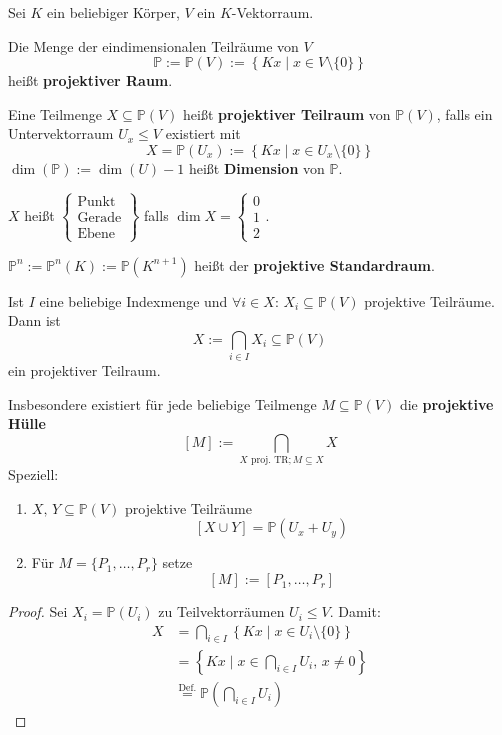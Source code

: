 \documentclass[parskip,a4paper,twoside,DIV15,BCOR12mm]{scrbook}
\begin{document}
Sei \(K\) ein beliebiger Körper, \(V\) ein \(K\)-Vektorraum.
\begin{definition}
Die Menge der eindimensionalen Teilräume von \(V\)
\[
\mathbb{P}:=\mathbb{P}(V):=\left\{Kx\mid x\in V\setminus\{0\}\right\}
\]
heißt \textbf{projektiver Raum}.

Eine Teilmenge \(X\subseteq\mathbb{P}(V)\) heißt 
\textbf{projektiver Teilraum} von \(\mathbb{P}(V)\), falls ein Untervektorraum
\(U_{x}\leq V\) existiert mit
\[
X=\mathbb{P}(U_{x}):=\left\{Kx\mid x\in U_{x}\setminus\{0\}\right\}
\]
\(\dim(\mathbb{P}):=\dim(U)-1\) heißt \textbf{Dimension} von \(\mathbb{P}\).

\(X\) heißt 
\(\left.
    \begin{cases}\text{Punkt}\\\text{Gerade}\\\text{Ebene}\end{cases}
\right\}\) falls \(\dim X=\begin{cases}0\\1\\2\end{cases}\).

\(\mathbb{P}^{n}:=\mathbb{P}^{n}(K):=\mathbb{P}(K^{n+1})\) heißt der
\textbf{projektive Standardraum}.
\end{definition}
\begin{comment}
Die leere Menge \(\varnothing\) ist ein projektiver Raum mit 
\(U_{\varnothing}=\{0\}\), also \(\dim\varnothing=-1\).
\end{comment}
\begin{lemma}
Ist \(I\) eine beliebige Indexmenge und 
    \(\forall i\in X:\,X_{i}\subseteq\mathbb{P}(V)\) projektive Teilräume.
Dann ist
\[
X:=\bigcap_{i\in I}{X_{i}}\subseteq\mathbb{P}(V)
\]
ein projektiver Teilraum.

Insbesondere existiert für jede beliebige Teilmenge 
\(M\subseteq\mathbb{P}(V)\) die \textbf{projektive Hülle}
\[
[M]:=\bigcap_{X\text{ proj. TR};M\subseteq X}{X}
\]
Speziell:
\begin{enumerate}
\item \(X,\,Y\subseteq\mathbb{P}(V)\) projektive Teilräume
\[
[X\cup Y]=\mathbb{P}(U_{x}+U_{y})
\]
\item Für \(M=\{P_{1},\ldots,P_{r}\}\) setze
\[
[M]:=[P_{1},\ldots,P_{r}]
\]
\end{enumerate}
\end{lemma}
\begin{proof}
Sei \(X_{i}=\mathbb{P}(U_{i})\) zu Teilvektorräumen \(U_{i}\leq V\). Damit:
\begin{align*}
X&=\bigcap_{i\in I}{\left\{Kx\mid x\in U_{i}\setminus\{0\}\right\}}\\
&=\left\{Kx\mid x\in\bigcap_{i\in I}{U_{i}},\,x\neq0\right\}\\
&\overset{\text{Def.}}{=}\mathbb{P}\left(\bigcap_{i\in I}{U_{i}}\right)
\end{align*}
\end{proof}
\end{document}
